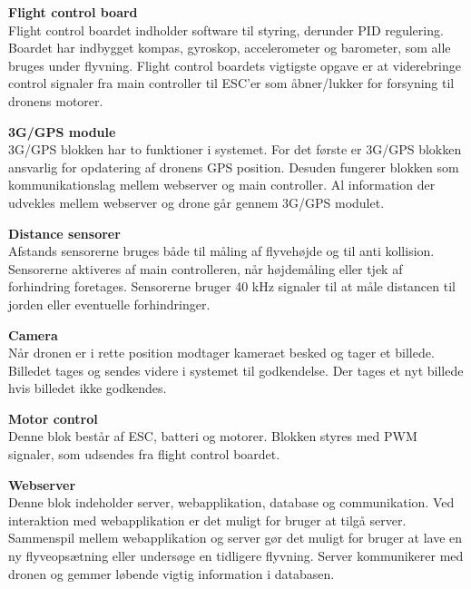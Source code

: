 \textbf{Flight control board}\\
Flight control boardet indholder software til styring, derunder PID regulering. Boardet har indbygget kompas, gyroskop, accelerometer og barometer, som alle bruges under flyvning. Flight control boardets vigtigste opgave er at viderebringe control signaler fra main controller til ESC'er som åbner/lukker for forsyning til dronens motorer. 

\textbf{3G/GPS module}\\
3G/GPS blokken har to funktioner i systemet. For det første er 3G/GPS blokken ansvarlig for opdatering af dronens GPS position. Desuden fungerer blokken som kommunikationslag mellem webserver og main controller. Al information der udvekles mellem webserver og drone går gennem 3G/GPS modulet.

\textbf{Distance sensorer}\\
Afstands sensorerne bruges både til måling af flyvehøjde og til anti kollision. Sensorerne aktiveres af main controlleren, når højdemåling eller tjek af forhindring foretages. Sensorerne bruger 40 kHz signaler til at måle distancen til jorden eller eventuelle forhindringer.

\textbf{Camera}\\
Når dronen er i rette position modtager kameraet besked og tager et billede. Billedet tages og sendes videre i systemet til godkendelse. Der tages et nyt billede hvis billedet ikke godkendes.

\textbf{Motor control}\\
Denne blok består af ESC, batteri og motorer. Blokken styres med PWM signaler, som udsendes fra flight control boardet.

\textbf{Webserver}\\
Denne blok indeholder server, webapplikation, database og communikation. 
Ved interaktion med webapplikation er det muligt for bruger at tilgå server. Sammenspil mellem webapplikation og server gør det muligt for bruger at lave en ny flyveopsætning eller undersøge en tidligere flyvning. Server kommunikerer med dronen og gemmer løbende vigtig information i databasen.
